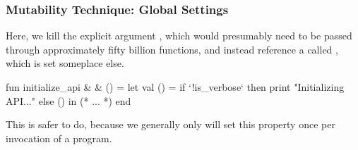 \documentclass[aspectratio=169]{beamer}
\begin{document}
\begin{frame}[fragile]
  \frametitle{Mutability Technique: Global Settings}

  Here, we kill the explicit argument , which would
  presumably need to be passed through approximately fifty billion functions,
  and instead reference a  called , which is
  set someplace else.

  \pause
  \vspace{\fill}

  \begin{codeblock}
    fun initialize_api & & () =
      let
        val () = if `!is_verbose` then
                   print "Initializing API...\n"
                 else ()
      in
        (* ... *)
      end
  \end{codeblock}

  \pause
  \vspace{\fill}

  This is safer to do, because we generally only will set this property once
  per invocation of a program.
\end{frame}



\thankyou

\lecturePassword{}
\end{document}
